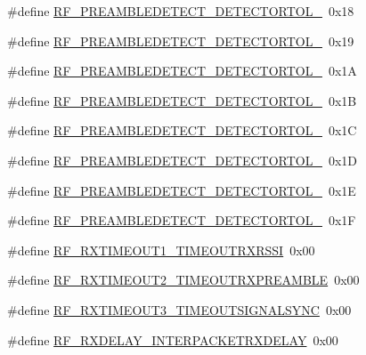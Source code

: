 \begin{DoxyCompactItemize}
\item 
\#define \hyperlink{sx1276Regs-Fsk_8h_aef7179fc37f80c1dcf77e12ebafa1b50}{R\+F\+\_\+\+P\+R\+E\+A\+M\+B\+L\+E\+D\+E\+T\+E\+C\+T\+\_\+\+D\+E\+T\+E\+C\+T\+O\+R\+T\+O\+L\+\_}~0x18
\item 
\#define \hyperlink{sx1276Regs-Fsk_8h_ab5b2d80ff0b029a3de2dd04b83fc4313}{R\+F\+\_\+\+P\+R\+E\+A\+M\+B\+L\+E\+D\+E\+T\+E\+C\+T\+\_\+\+D\+E\+T\+E\+C\+T\+O\+R\+T\+O\+L\+\_}~0x19
\item 
\#define \hyperlink{sx1276Regs-Fsk_8h_ab588e51e9deb46dc1349326566bde157}{R\+F\+\_\+\+P\+R\+E\+A\+M\+B\+L\+E\+D\+E\+T\+E\+C\+T\+\_\+\+D\+E\+T\+E\+C\+T\+O\+R\+T\+O\+L\+\_}~0x1A
\item 
\#define \hyperlink{sx1276Regs-Fsk_8h_a73aa24ae139867b133532a5c8c0be09f}{R\+F\+\_\+\+P\+R\+E\+A\+M\+B\+L\+E\+D\+E\+T\+E\+C\+T\+\_\+\+D\+E\+T\+E\+C\+T\+O\+R\+T\+O\+L\+\_}~0x1B
\item 
\#define \hyperlink{sx1276Regs-Fsk_8h_ad119978aa14dfd4d1505c29a6732c11e}{R\+F\+\_\+\+P\+R\+E\+A\+M\+B\+L\+E\+D\+E\+T\+E\+C\+T\+\_\+\+D\+E\+T\+E\+C\+T\+O\+R\+T\+O\+L\+\_}~0x1C
\item 
\#define \hyperlink{sx1276Regs-Fsk_8h_aae822debf5d31da445ec5836bd6c293b}{R\+F\+\_\+\+P\+R\+E\+A\+M\+B\+L\+E\+D\+E\+T\+E\+C\+T\+\_\+\+D\+E\+T\+E\+C\+T\+O\+R\+T\+O\+L\+\_}~0x1D
\item 
\#define \hyperlink{sx1276Regs-Fsk_8h_a909bc72cec5165d5a6374b88b5d3ea6a}{R\+F\+\_\+\+P\+R\+E\+A\+M\+B\+L\+E\+D\+E\+T\+E\+C\+T\+\_\+\+D\+E\+T\+E\+C\+T\+O\+R\+T\+O\+L\+\_}~0x1E
\item 
\#define \hyperlink{sx1276Regs-Fsk_8h_a0c05079f0ba1fe02406808d156d78937}{R\+F\+\_\+\+P\+R\+E\+A\+M\+B\+L\+E\+D\+E\+T\+E\+C\+T\+\_\+\+D\+E\+T\+E\+C\+T\+O\+R\+T\+O\+L\+\_}~0x1F
\item 
\#define \hyperlink{sx1276Regs-Fsk_8h_aac1596be27776611ff5936e308cdb900}{R\+F\+\_\+\+R\+X\+T\+I\+M\+E\+O\+U\+T1\+\_\+\+T\+I\+M\+E\+O\+U\+T\+R\+X\+R\+S\+SI}~0x00
\item 
\#define \hyperlink{sx1276Regs-Fsk_8h_a28172a613ca2fd8925df8b1722bf58ea}{R\+F\+\_\+\+R\+X\+T\+I\+M\+E\+O\+U\+T2\+\_\+\+T\+I\+M\+E\+O\+U\+T\+R\+X\+P\+R\+E\+A\+M\+B\+LE}~0x00
\item 
\#define \hyperlink{sx1276Regs-Fsk_8h_aaee5dfb33a404f5cbdba0a317cb45907}{R\+F\+\_\+\+R\+X\+T\+I\+M\+E\+O\+U\+T3\+\_\+\+T\+I\+M\+E\+O\+U\+T\+S\+I\+G\+N\+A\+L\+S\+Y\+NC}~0x00
\item 
\#define \hyperlink{sx1276Regs-Fsk_8h_a3e60ee872c200009c326412fbc4a84c8}{R\+F\+\_\+\+R\+X\+D\+E\+L\+A\+Y\+\_\+\+I\+N\+T\+E\+R\+P\+A\+C\+K\+E\+T\+R\+X\+D\+E\+L\+AY}~0x00

\end{DoxyCompactItemize}
